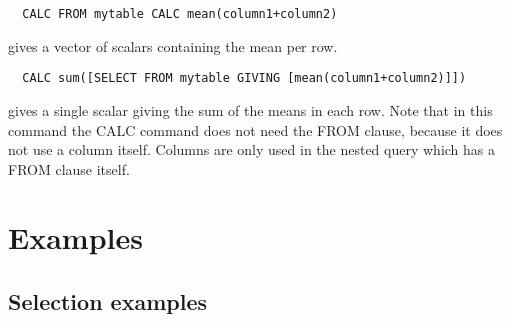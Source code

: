 \begin{verbatim}
  CALC FROM mytable CALC mean(column1+column2)
\end{verbatim}
gives a vector of scalars containing the mean per row.

\begin{verbatim}
  CALC sum([SELECT FROM mytable GIVING [mean(column1+column2)]])
\end{verbatim}
gives a single scalar giving the sum of the means in each row.
Note that in this command the CALC command does not need the FROM
clause, because it does not use a column itself. Columns are only
used in the nested query which has a FROM clause itself.

\section{Examples}
\subsection{\label{TAQL:SELEXAMPLES}Selection examples}
